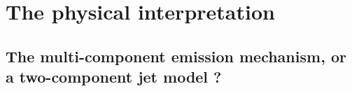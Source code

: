 \documentclass[linenumbers,twocolumn]{aastex631}
\begin{document}
\section{The physical interpretation}\label{sec:physical_interpretation}




\subsection{The multi-component emission mechanism, or a two-component jet model ?}\label{sec: multi}
\end{document}

